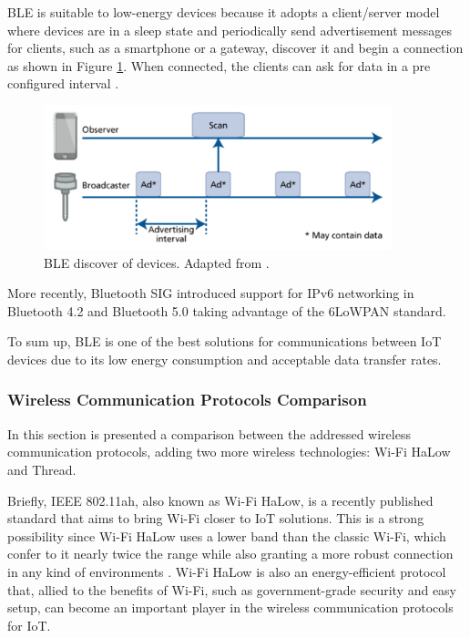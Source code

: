 BLE is suitable to low-energy devices because it adopts a client/server model where devices are in a sleep state and periodically send advertisement messages for clients, such as a smartphone or a gateway, discover it and begin a connection as shown in Figure \ref{fig:ble2}. When connected, the clients can ask for data in a pre configured interval \cite{Andersson2014}. 

\begin{figure}[H]
	\centering
	\includegraphics[width=0.9\textwidth]{figures/ble2.png}
	\caption{BLE discover of devices. Adapted from \cite{Andersson2014}.}
	\label{fig:ble2}
\end{figure}

More recently, Bluetooth SIG introduced support for IPv6 networking in Bluetooth 4.2 and Bluetooth 5.0 taking advantage of the 6LoWPAN standard.

To sum up, BLE is one of the best solutions for communications between IoT devices due to its low energy consumption and acceptable data transfer rates.


\subsubsection{Wireless Communication Protocols Comparison}

In this section is presented a comparison between the addressed wireless communication protocols, adding two more wireless technologies: Wi-Fi HaLow \cite{Wi-FiAlliance2017} and Thread.

Briefly, IEEE 802.11ah, also known as Wi-Fi HaLow, is a recently published standard that aims to bring Wi-Fi closer to IoT solutions. This is a strong possibility since Wi-Fi HaLow uses a lower band than the classic Wi-Fi, which confer to it nearly twice the range while also granting a more robust connection in any kind of environments \cite{Wi-FiAlliance2017}. Wi-Fi HaLow is also an energy-efficient protocol that, allied to the benefits of Wi-Fi, such as government-grade security and easy setup, can become an important player in the wireless communication protocols for IoT.

